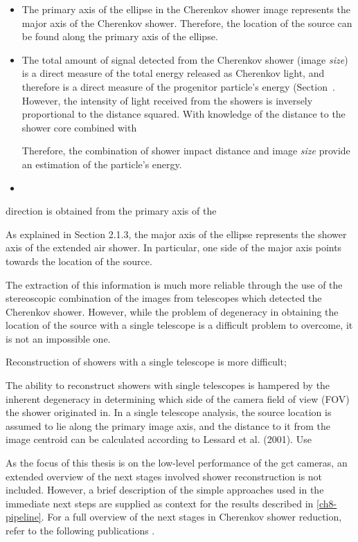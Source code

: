 \begin{itemize}
\item The primary axis of the ellipse in the Cherenkov shower image represents the major axis of the Cherenkov shower. Therefore, the location of the source can be found along the primary axis of the ellipse. 
\item The total amount of signal detected from the Cherenkov shower (image \textit{size}) is a direct measure of the total energy released as Cherenkov light, and therefore is a direct measure of the progenitor particle's energy (Section~. However, the intensity of light received from the showers is inversely proportional to the distance squared. With knowledge of the distance to the shower core combined with 

Therefore, the combination of shower impact distance and image \textit{size} provide an estimation of the particle's energy.
\item 
\end{itemize}



direction is obtained from the primary axis of the 

As explained in Section 2.1.3, the major axis of the ellipse represents the
shower axis of the extended air shower. In particular, one side of the major
axis points towards the location of the source.

The extraction of this information is much more reliable through the use of the stereoscopic combination of the images from telescopes which detected the Cherenkov shower. However, while the problem of degeneracy in obtaining the location of the source with a single telescope is a difficult problem to overcome, it is not an impossible one.


Reconstruction of showers with a single telescope is more difficult; 

The ability to reconstruct showers with single telescopes is hampered by
the inherent degeneracy in determining which side of the camera field of view (FOV) the shower originated in. In a single telescope analysis, the source location is assumed to lie along the primary image axis, and the distance to it from the image centroid can be calculated according to Lessard et al. (2001). Use

As the focus of this thesis is on the low-level performance of the \gls{gct} cameras, an extended overview of the next stages involved shower reconstruction is not included. However, a brief description of the simple approaches used in the immediate next steps are supplied as context for the results described in \ref{ch8-pipeline}. For a full overview of the next stages in Cherenkov shower reduction, refer to the following publications .

